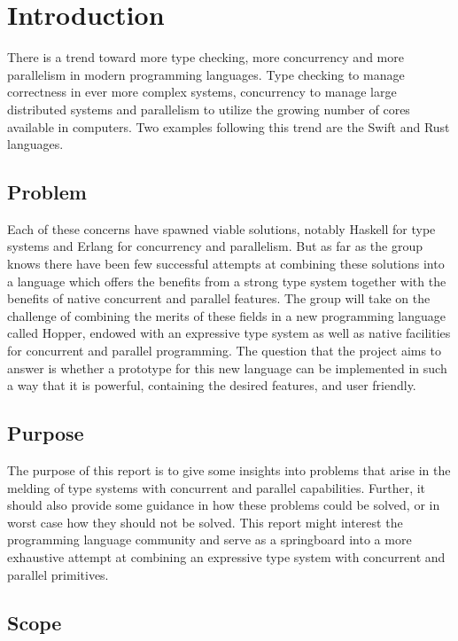 \chapter{Introduction}

There is a trend toward more type checking, more concurrency and more parallelism in modern programming languages. Type checking to manage correctness in ever more complex systems, concurrency to manage large distributed systems and parallelism to utilize the growing number of cores available in computers. Two examples following this trend are the Swift\cite{swift} and Rust\cite{rust} languages.

\section{Problem}

Each of these concerns have spawned viable solutions, notably Haskell\cite{haskell} for type systems and Erlang\cite{erlang} for concurrency and parallelism. But as far as the group knows there have been few successful attempts at combining these solutions into a language which offers the benefits from a strong type system together with the benefits of native concurrent and parallel features. The group will take on the challenge of combining the merits of these fields in a new programming language called Hopper, endowed with an expressive type system as well as native facilities for concurrent and parallel programming. The question that the project aims to answer is whether a prototype for this new language can be implemented in such a way that it is powerful, containing the desired features, and user friendly.

\section{Purpose}

The purpose of this report is to give some insights into problems that arise in the melding of type systems with concurrent and parallel capabilities. Further, it should also provide some guidance in how these problems could be solved, or in worst case how they should not be solved. This report might interest the programming language community and serve as a springboard into a more exhaustive attempt at combining an expressive type system with concurrent and parallel primitives.

\section{Scope}

